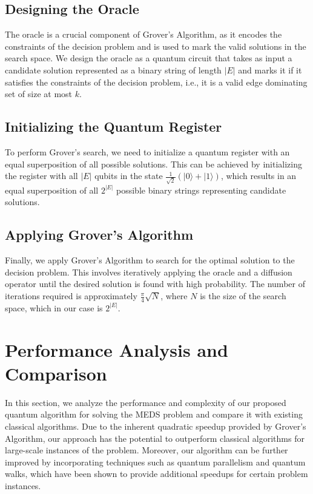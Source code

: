 \subsection{Designing the Oracle}
The oracle is a crucial component of Grover's Algorithm, as it encodes the constraints of the decision problem and is used to mark the valid solutions in the search space. We design the oracle as a quantum circuit that takes as input a candidate solution represented as a binary string of length $|E|$ and marks it if it satisfies the constraints of the decision problem, i.e., it is a valid edge dominating set of size at most $k$.

\subsection{Initializing the Quantum Register}
To perform Grover's search, we need to initialize a quantum register with an equal superposition of all possible solutions. This can be achieved by initializing the register with all $|E|$ qubits in the state $\frac{1}{\sqrt{2}}(|0\rangle + |1\rangle)$, which results in an equal superposition of all $2^{|E|}$ possible binary strings representing candidate solutions.

\subsection{Applying Grover's Algorithm}
Finally, we apply Grover's Algorithm to search for the optimal solution to the decision problem. This involves iteratively applying the oracle and a diffusion operator until the desired solution is found with high probability. The number of iterations required is approximately $\frac{\pi}{4}\sqrt{N}$, where $N$ is the size of the search space, which in our case is $2^{|E|}$.

\section{Performance Analysis and Comparison} \label{sec:analysis}
In this section, we analyze the performance and complexity of our proposed quantum algorithm for solving the MEDS problem and compare it with existing classical algorithms. Due to the inherent quadratic speedup provided by Grover's Algorithm, our approach has the potential to outperform classical algorithms for large-scale instances of the problem. Moreover, our algorithm can be further improved by incorporating techniques such as quantum parallelism and quantum walks, which have been shown to provide additional speedups for certain problem instances.


